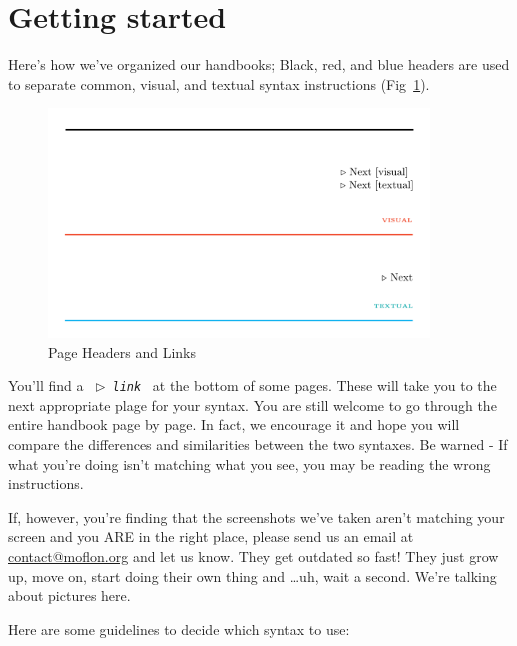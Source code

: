 \section{Getting started}
\genHeader 

Here's how we've organized our handbooks; Black, red, and blue headers are used to separate common, visual, and textual syntax
instructions (Fig~\ref{pageExamples}).

\begin{figure}[htbp] \centering
  \includegraphics[width=0.9\textwidth]{headers}
	\caption{Page Headers and Links} 
	\label{pageExamples} 
\end{figure}

You'll find a \mbox{ $\triangleright$ {\texttt {\emph{link}}} } at the bottom of some pages. These will take you to the next appropriate plage for your syntax.
You are still welcome to go through the entire handbook page by page. In fact, we encourage it and hope you will compare the differences and similarities
between the two syntaxes. Be warned - If what you're doing isn't matching what you see, you may be reading the wrong instructions.

If, however, you're finding that the screenshots we've taken aren't matching your screen and you ARE in the right place, please send us an email at
\href{mailto:contact@moflon.org}{contact@moflon.org} and let us know. They get outdated so fast! They just grow up, move on, start doing their own thing and
\ldots uh, wait a second. We're talking about pictures here.

Here are some guidelines to decide which syntax to use:


